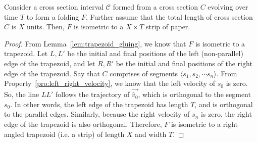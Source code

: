 \begin{theorem}
\label{thm:interval_strip}
Consider a cross section interval $\mathcal C$ formed from a cross section $C$ evolving over time $T$ to form a folding $F$.
Further assume that the total length of cross section $C$ is $X$ units. Then, $F$ is isometric to a $X\times T$ strip of paper.
\end{theorem}
\begin{proof}
From Lemma~\ref{lem:trapezoid_gluing}, we know that $F$ is isometric to a trapezoid.
Let $L,L'$ be the initial and final positions of the left (non-parallel) edge of the trapezoid, and
let $R,R'$ be the initial and final positions of the right edge of the trapezoid.
Say that $C$ comprises of segments $ \langle s_1, s_2,\cdots s_n \rangle$.
From Property~\ref{pro:left_right_velocity}, we know that the left velocity of $s_0$ is zero.
So, the line $LL'$ follows the trajectory of $\vec{\hat v_0}$, which is orthogonal to the segment $s_0$.
In other words, the left edge of the trapezoid has length $T$, and is orthogonal to the parallel edges.
Similarly, because the right velocity of $s_n$ is zero, the right edge of the trapezoid is also orthogonal.
Therefore, $F$ is isometric to a right angled trapezoid (i.e. a strip) of length $X$ and width $T$.
\end{proof}


